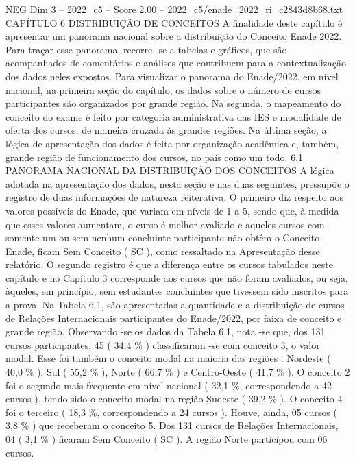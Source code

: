 \begin{textsample}{NEG Dim 3 – 2022\_c5 – Score 2.00 – 2022\_c5/enade\_2022\_ri\_c2843d8b68.txt}  \label{ex:f3_neg_217}
CAPÍTULO 6 DISTRIBUIÇÃO DE CONCEITOS A finalidade deste capítulo é apresentar um panorama nacional sobre a distribuição do Conceito Enade 2022.
Para traçar esse panorama, recorre -se a tabelas e gráficos, que são acompanhados de comentários e análises que contribuem para a contextualização dos dados neles expostos.
Para visualizar o panorama do Enade/2022, em nível nacional, na primeira seção do capítulo, os dados sobre o número de cursos participantes são organizados por grande região.
Na segunda, o mapeamento do conceito do exame é feito por categoria administrativa das IES e modalidade de oferta dos cursos, de maneira cruzada às grandes regiões.
Na última seção, a lógica de apresentação dos dados é feita por organização acadêmica e, também, grande região de funcionamento dos cursos, no país como um todo. 6.1 PANORAMA NACIONAL DA DISTRIBUIÇÃO DOS CONCEITOS A lógica adotada na apresentação dos dados, nesta seção e nas duas seguintes, pressupõe o registro de duas informações de natureza reiterativa.
O primeiro diz respeito aos valores possíveis do Enade, que variam em níveis de 1 a 5, sendo que, à medida que esses valores aumentam, o curso é melhor avaliado e aqueles cursos com somente um ou sem nenhum concluinte participante não obtêm o Conceito Enade, ficam Sem Conceito ( SC ), como ressaltado na Apresentação desse relatório.
O segundo registro é que a diferença entre os cursos tabulados neste capítulo e no Capítulo 3 corresponde aos cursos que não foram avaliados, ou seja, àqueles, em princípio, sem estudantes concluintes que tivessem sido inscritos para a prova.
Na Tabela 6.1, são apresentadas a quantidade e a distribuição de cursos de Relações Internacionais participantes do Enade/2022, por faixa de conceito e grande região.
Observando -se os dados da Tabela 6.1, nota -se que, dos 131 cursos participantes, 45 ( 34,4 \% ) classificaram -se com conceito 3, o valor modal.
Esse foi também o conceito modal na maioria das regiões : Nordeste ( 40,0 \% ), Sul ( 55,2 \% ), Norte ( 66,7 \% ) e Centro-Oeste ( 41,7 \% ).
O conceito 2 foi o segundo mais frequente em nível nacional ( 32,1 \%, correspondendo a 42 cursos ), tendo sido o conceito modal na região Sudeste ( 39,2 \% ).
O conceito 4 foi o terceiro ( 18,3 \%, correspondendo a 24 cursos ).
Houve, ainda, 05 cursos ( 3,8 \% ) que receberam o conceito 5.
Dos 131 cursos de Relações Internacionais, 04 ( 3,1 \% ) ficaram Sem Conceito ( SC ).
A região Norte participou com 06 cursos.

\end{textsample}
